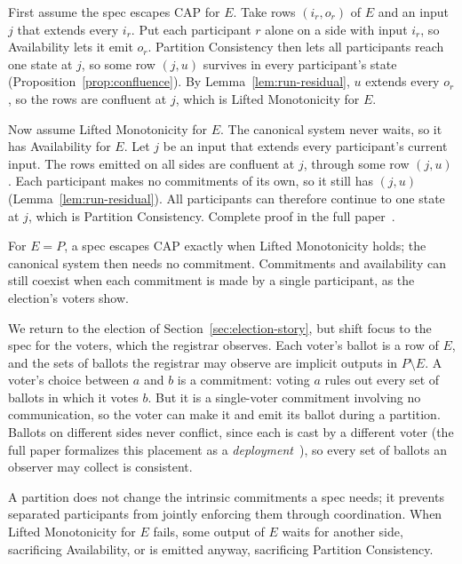 \documentclass[sigconf]{cidr-2027}
\makeatletter
\theoremstyle{remark}
\newcommand{\commitment}{commitment\xspace}
\newcommand{\commitments}{commitments\xspace}
\newcommand{\Commitments}{Commitments\xspace}
\newcommand{\inrel}{extends\xspace}          %
\newcommand{\outrel}{extends\xspace}          %
\newcommand{\fullproof}{Complete proof in the full paper~\cite{hellerstein2026completecalmfull}.}
\renewenvironment{proof}[1][\proofname]{\par
  \pushQED{\qed}\normalfont\topsep2\p@\relax
  \trivlist\item[\@proofindent\hskip\labelsep{\@proofnamefont #1\@addpunct{.}}]\ignorespaces
}{\popQED\endtrivlist\@endpefalse}
\makeatother
\begin{document}
\begin{proof}[Proof sketch]
First assume the spec escapes CAP for $E$.  Take rows $(i_r,o_r)$ of $E$ and
an input $j$ that \inrel every $i_r$.  Put each participant $r$ alone on a side
with input $i_r$, so Availability lets it emit $o_r$.  Partition Consistency
then lets all participants reach one state at $j$, so some row $(j,u)$ survives
in every participant's state (Proposition~\ref{prop:confluence}).  By
Lemma~\ref{lem:run-residual}, $u$ \outrel every $o_r$, so the rows are
confluent at $j$, which is Lifted Monotonicity for $E$.

Now assume Lifted Monotonicity for $E$.  The canonical system never waits, so
it has Availability for $E$.  Let $j$ be an input that \inrel every
participant's current input.  The rows emitted on all sides are confluent at
$j$, through some row $(j,u)$.  Each participant makes no \commitments of its own, so it
still has $(j,u)$ (Lemma~\ref{lem:run-residual}).  All participants can
therefore continue to one state at $j$, which is Partition Consistency.
\fullproof
\end{proof}

For $E=P$, a spec escapes CAP exactly when Lifted Monotonicity holds; the canonical system then needs no \commitment. \Commitments and availability can still coexist when each \commitment is made by a single participant, as the election's voters show.

We return to the election of Section~\ref{sec:election-story}, but shift focus to the spec
for the voters, which the registrar observes.  Each
voter's ballot is a row of $E$, and the sets of ballots the registrar may
observe are implicit outputs in $P\setminus E$.  A voter's choice between $a$
and $b$ is a \commitment: voting $a$ rules out every set of ballots in which it
votes $b$.  But it is a single-voter \commitment involving no communication, so
the voter can make it and emit its ballot during a partition.  Ballots on
different sides never conflict, since each is cast by a different voter (the
full paper formalizes this placement as a \emph{deployment}~\cite{hellerstein2026completecalmfull}), so every set of ballots an observer may collect is consistent.

A partition does not change the intrinsic \commitments a spec needs; it
prevents separated participants from jointly enforcing them through
coordination.  When Lifted Monotonicity for $E$ fails, some output of
$E$ waits for another side, sacrificing Availability, or is emitted
anyway, sacrificing Partition Consistency.
\end{document}
